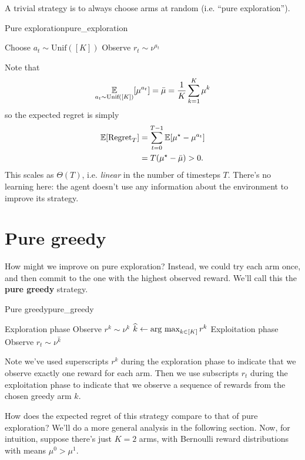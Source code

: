 \documentclass[\main/main]{subfiles}
\begin{document}
A trivial strategy is to always choose arms at random (i.e. ``pure exploration'').
\begin{definition}{Pure exploration}{pure_exploration}
    \begin{algorithmic}
        \State Choose $a_t \sim \text{Unif}([K])$
        \State Observe $r_t \sim \nu^{a_t}$
        \EndFor
    \end{algorithmic}
\end{definition}
Note that \[
    \operatorname*{\mathbb{E}}_{a_t \sim \text{Unif}([K])}[\mu^{a_t}] = \bar \mu = \frac{1}{K} \sum_{k=1}^K \mu^k
\] so the expected regret is simply
\begin{align*}
    \operatorname*{\mathbb{E}}[\text{Regret}_T] & = \sum_{t=0}^{T-1} \operatorname*{\mathbb{E}}[\mu^\star - \mu^{a_t}] \\
                        & = T (\mu^\star - \bar \mu) > 0.
\end{align*}
This scales as $\Theta(T)$, i.e. \emph{linear} in the number of timesteps $T$. There's no learning here: the agent doesn't use any information about the environment to improve its strategy.

\section{Pure greedy}

How might we improve on pure exploration? Instead, we could try each arm once, and then commit to the one with the highest observed reward. We'll call this the \textbf{pure greedy} strategy.

\begin{definition}{Pure greedy}{pure_greedy}
    \begin{algorithmic}
        \Comment Exploration phase
        \State Observe $r^k \sim \nu^k$
        \EndFor
        \State $\widehat k \gets \operatorname*{\textrm{arg\ max}}_{k \in [K]} r^k$
        \Comment Exploitation phase
        \State Observe $r_t \sim \nu^{\hat k}$
        \EndFor
    \end{algorithmic}
    Note we've used superscripts $r^k$ during the exploration phase to indicate that we observe exactly one reward for each arm. Then we use subscripts $r_t$ during the exploitation phase to indicate that we observe a sequence of rewards from the chosen greedy arm $\hat k$.
\end{definition}

How does the expected regret of this strategy compare to that of pure exploration? We'll do a more general analysis in the following section. Now, for intuition, suppose there's just $K=2$ arms, with Bernoulli reward distributions with means $\mu^0 > \mu^1$.
\end{document}
